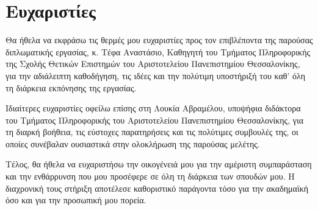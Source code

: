 

\chapter*{Ευχαριστίες}

Θα ήθελα να εκφράσω τις θερμές μου ευχαριστίες προς τον επιβλέποντα της παρούσας διπλωματικής εργασίας, 
κ. Τέφα Αναστάσιο, Καθηγητή του Τμήματος Πληροφορικής της Σχολής Θετικών Επιστημών του Αριστοτελείου 
Πανεπιστημίου Θεσσαλονίκης, για την αδιάλειπτη καθοδήγηση, τις ιδέες και την πολύτιμη 
υποστήριξή του καθ’ όλη τη διάρκεια εκπόνησης της εργασίας.

Ιδιαίτερες ευχαριστίες οφείλω επίσης στη Λουκία Αβραμέλου, υποψήφια διδάκτορα του Τμήματος Πληροφορικής του 
Αριστοτελείου Πανεπιστημίου Θεσσαλονίκης, για τη διαρκή βοήθεια, τις εύστοχες παρατηρήσεις και τις πολύτιμες 
συμβουλές της, οι οποίες συνέβαλαν ουσιαστικά στην ολοκλήρωση της παρούσας μελέτης.

Τέλος, θα ήθελα να ευχαριστήσω την οικογένειά μου για την αμέριστη συμπαράσταση και την ενθάρρυνση 
που μου προσέφερε σε όλη τη διάρκεια των σπουδών μου. Η διαχρονική τους στήριξη αποτέλεσε καθοριστικό παράγοντα 
τόσο για την ακαδημαϊκή όσο και για την προσωπική μου πορεία.